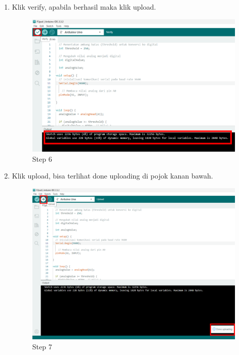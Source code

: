 \begin{center}
\begin{enumerate}
		\item Klik verify, apabila berhasil maka klik upload.
		\begin{figure}[H]
			\centering
			\includegraphics[width=0.8\linewidth]{P2/img/per1/step 6.png}
			\caption{Step 6}
			\label{fig:Step 6(Step 6)} 
		\end{figure}

		\item Klik upload, bisa terlihat done uploading di pojok kanan bawah. 
		\begin{figure}[H]
			\centering
			\includegraphics[width=0.8\linewidth]{P2/img/per1/step 7.png}
			\caption{Step 7}
			\label{fig:Step 7(Step 7)} 
		\end{figure}
	\end{enumerate}


\end{center}
